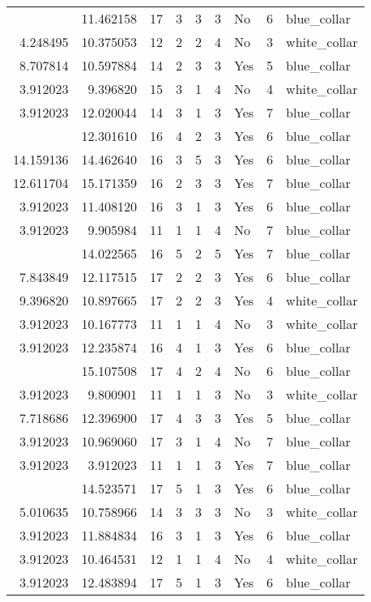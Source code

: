 \documentclass[
]{article}
\begin{document}
\begin{longtable}[t]{rrrrrllrl}
\addlinespace
11.976974 & 11.462158 & 17 & 3 & 3 & 3 & No & 6 & blue\_collar\\
4.248495 & 10.375053 & 12 & 2 & 2 & 4 & No & 3 & white\_collar\\
8.707814 & 10.597884 & 14 & 2 & 3 & 3 & Yes & 5 & blue\_collar\\
3.912023 & 9.396820 & 15 & 3 & 1 & 4 & No & 4 & white\_collar\\
3.912023 & 12.020044 & 14 & 3 & 1 & 3 & Yes & 7 & blue\_collar\\
\addlinespace
6.956545 & 12.301610 & 16 & 4 & 2 & 3 & Yes & 6 & blue\_collar\\
14.159136 & 14.462640 & 16 & 3 & 5 & 3 & Yes & 6 & blue\_collar\\
12.611704 & 15.171359 & 16 & 2 & 3 & 3 & Yes & 7 & blue\_collar\\
3.912023 & 11.408120 & 16 & 3 & 1 & 3 & Yes & 6 & blue\_collar\\
3.912023 & 9.905984 & 11 & 1 & 1 & 4 & No & 7 & blue\_collar\\
\addlinespace
9.396820 & 14.022565 & 16 & 5 & 2 & 5 & Yes & 7 & blue\_collar\\
7.843849 & 12.117515 & 17 & 2 & 2 & 3 & Yes & 6 & blue\_collar\\
9.396820 & 10.897665 & 17 & 2 & 2 & 3 & Yes & 4 & white\_collar\\
3.912023 & 10.167773 & 11 & 1 & 1 & 4 & No & 3 & white\_collar\\
3.912023 & 12.235874 & 16 & 4 & 1 & 3 & Yes & 6 & blue\_collar\\
\addlinespace
8.915969 & 15.107508 & 17 & 4 & 2 & 4 & No & 6 & blue\_collar\\
3.912023 & 9.800901 & 11 & 1 & 1 & 3 & No & 3 & white\_collar\\
7.718686 & 12.396900 & 17 & 4 & 3 & 3 & Yes & 5 & blue\_collar\\
3.912023 & 10.969060 & 17 & 3 & 1 & 4 & No & 7 & blue\_collar\\
3.912023 & 3.912023 & 11 & 1 & 1 & 3 & Yes & 7 & blue\_collar\\
\addlinespace
3.912023 & 14.523571 & 17 & 5 & 1 & 3 & Yes & 6 & blue\_collar\\
5.010635 & 10.758966 & 14 & 3 & 3 & 3 & No & 3 & white\_collar\\
3.912023 & 11.884834 & 16 & 3 & 1 & 3 & Yes & 6 & blue\_collar\\
3.912023 & 10.464531 & 12 & 1 & 1 & 4 & No & 4 & white\_collar\\
3.912023 & 12.483894 & 17 & 5 & 1 & 3 & Yes & 6 & blue\_collar\\

\end{longtable}
\end{document}
